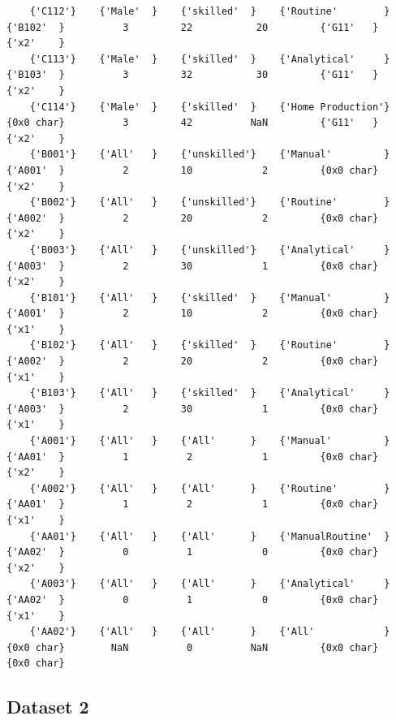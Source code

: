 \documentclass[
]{book}
\begin{document}
\begin{verbatim}
    {'C112'}    {'Male'  }    {'skilled'  }    {'Routine'        }      {'B102'  }          3         22           20         {'G11'   }    {'x2'    }
    {'C113'}    {'Male'  }    {'skilled'  }    {'Analytical'     }      {'B103'  }          3         32           30         {'G11'   }    {'x2'    }
    {'C114'}    {'Male'  }    {'skilled'  }    {'Home Production'}      {0x0 char}          3         42          NaN         {'G11'   }    {'x2'    }
    {'B001'}    {'All'   }    {'unskilled'}    {'Manual'         }      {'A001'  }          2         10            2         {0x0 char}    {'x2'    }
    {'B002'}    {'All'   }    {'unskilled'}    {'Routine'        }      {'A002'  }          2         20            2         {0x0 char}    {'x2'    }
    {'B003'}    {'All'   }    {'unskilled'}    {'Analytical'     }      {'A003'  }          2         30            1         {0x0 char}    {'x2'    }
    {'B101'}    {'All'   }    {'skilled'  }    {'Manual'         }      {'A001'  }          2         10            2         {0x0 char}    {'x1'    }
    {'B102'}    {'All'   }    {'skilled'  }    {'Routine'        }      {'A002'  }          2         20            2         {0x0 char}    {'x1'    }
    {'B103'}    {'All'   }    {'skilled'  }    {'Analytical'     }      {'A003'  }          2         30            1         {0x0 char}    {'x1'    }
    {'A001'}    {'All'   }    {'All'      }    {'Manual'         }      {'AA01'  }          1          2            1         {0x0 char}    {'x2'    }
    {'A002'}    {'All'   }    {'All'      }    {'Routine'        }      {'AA01'  }          1          2            1         {0x0 char}    {'x1'    }
    {'AA01'}    {'All'   }    {'All'      }    {'ManualRoutine'  }      {'AA02'  }          0          1            0         {0x0 char}    {'x2'    }
    {'A003'}    {'All'   }    {'All'      }    {'Analytical'     }      {'AA02'  }          0          1            0         {0x0 char}    {'x1'    }
    {'AA02'}    {'All'   }    {'All'      }    {'All'            }      {0x0 char}        NaN          0          NaN         {0x0 char}    {0x0 char}
\end{verbatim}

\hypertarget{dataset-2}{%
\subsection{Dataset 2}\label{dataset-2}}
\end{document}
